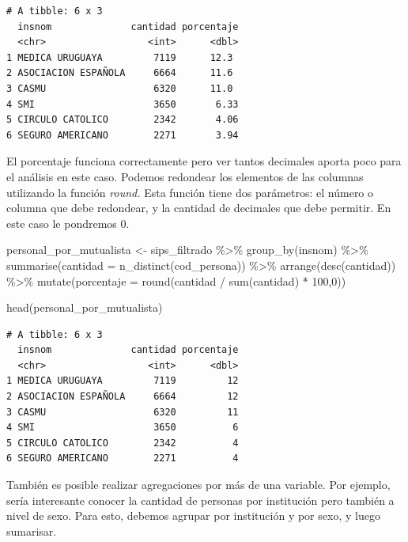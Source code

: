 \documentclass[
  letterpaper,
  DIV=11,
  numbers=noendperiod]{scrreprt}
\newenvironment{Shaded}{\begin{snugshade}}{\end{snugshade}}
\newcommand{\AttributeTok}[1]{\textcolor[rgb]{0.40,0.45,0.13}{#1}}
\newcommand{\DecValTok}[1]{\textcolor[rgb]{0.68,0.00,0.00}{#1}}
\newcommand{\FunctionTok}[1]{\textcolor[rgb]{0.28,0.35,0.67}{#1}}
\newcommand{\NormalTok}[1]{\textcolor[rgb]{0.00,0.23,0.31}{#1}}
\newcommand{\OtherTok}[1]{\textcolor[rgb]{0.00,0.23,0.31}{#1}}
\newcommand{\SpecialCharTok}[1]{\textcolor[rgb]{0.37,0.37,0.37}{#1}}
\begin{document}
\begin{verbatim}
# A tibble: 6 x 3
  insnom              cantidad porcentaje
  <chr>                  <int>      <dbl>
1 MEDICA URUGUAYA         7119      12.3 
2 ASOCIACION ESPAÑOLA     6664      11.6 
3 CASMU                   6320      11.0 
4 SMI                     3650       6.33
5 CIRCULO CATOLICO        2342       4.06
6 SEGURO AMERICANO        2271       3.94
\end{verbatim}

El porcentaje funciona correctamente pero ver tantos decimales aporta
poco para el análisis en este caso. Podemos redondear los elementos de
las columnas utilizando la función \emph{round.} Esta función tiene dos
parámetros: el número o columna que debe redondear, y la cantidad de
decimales que debe permitir. En este caso le pondremos 0.

\begin{Shaded}
\begin{Highlighting}[]
\NormalTok{personal\_por\_mutualista }\OtherTok{\textless{}{-}}\NormalTok{ sips\_filtrado }\SpecialCharTok{\%\textgreater{}\%} 
  \FunctionTok{group\_by}\NormalTok{(insnom) }\SpecialCharTok{\%\textgreater{}\%} 
  \FunctionTok{summarise}\NormalTok{(}\AttributeTok{cantidad =} \FunctionTok{n\_distinct}\NormalTok{(cod\_persona)) }\SpecialCharTok{\%\textgreater{}\%} 
  \FunctionTok{arrange}\NormalTok{(}\FunctionTok{desc}\NormalTok{(cantidad)) }\SpecialCharTok{\%\textgreater{}\%} 
  \FunctionTok{mutate}\NormalTok{(}\AttributeTok{porcentaje =} \FunctionTok{round}\NormalTok{(cantidad }\SpecialCharTok{/} \FunctionTok{sum}\NormalTok{(cantidad) }\SpecialCharTok{*} \DecValTok{100}\NormalTok{,}\DecValTok{0}\NormalTok{))}

\FunctionTok{head}\NormalTok{(personal\_por\_mutualista)}
\end{Highlighting}
\end{Shaded}

\begin{verbatim}
# A tibble: 6 x 3
  insnom              cantidad porcentaje
  <chr>                  <int>      <dbl>
1 MEDICA URUGUAYA         7119         12
2 ASOCIACION ESPAÑOLA     6664         12
3 CASMU                   6320         11
4 SMI                     3650          6
5 CIRCULO CATOLICO        2342          4
6 SEGURO AMERICANO        2271          4
\end{verbatim}

También es posible realizar agregaciones por más de una variable. Por
ejemplo, sería interesante conocer la cantidad de personas por
institución pero también a nivel de sexo. Para esto, debemos agrupar por
institución y por sexo, y luego sumarisar.
\end{document}
